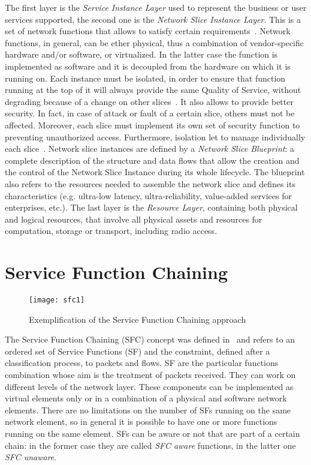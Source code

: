 The first layer is the \emph{Service Instance Layer} used to represent the
business or user services supported, the second one is the \emph{Network Slice
Instance Layer}. This is a set of network functions that allows to
satisfy certain requirements~\cite{kotulski2017end}. Network functions, in
general, can be ether physical, thus a combination of vendor-specific hardware
and/or software, or virtualized. In the latter case the function is implemented
as software and it is decoupled from the hardware on which it is running on.
Each instance must be isolated, in order to ensure that function running at the
top of it will always provide the same Quality of Service, without degrading
because of a change on other slices~\cite{richart2016resource}. It also allows
to provide better security. In fact, in case of attack or fault of a certain
slice, others must not be affected. Moreover, each slice must implement its own
set of security function to preventing unauthorized access. Furthermore,
isolation let to manage individually each slice~\cite{ordonez2017network}.
Network slice instances are defined by a \emph{Network Slice Blueprint}: a
complete description of the structure and data flows that allow the creation and
the control of the Network Slice Instance during its whole lifecycle. The
blueprint also refers to the resources needed to assemble the network slice and
defines its characteristics (e.g. ultra-low latency, ultra-reliability,
value-added services for enterprises, etc.). The last layer is the
\emph{Resource Layer}, containing both physical and logical resources, that
involve all physical assets and resources for computation, storage or transport,
including radio access.

\section{Service Function Chaining}
\begin{figure}
  \centering
  \texttt{[image: sfc1]}
  \caption{Exemplification of the Service Function Chaining approach}
  \label{chap:background:img:sfc}
\end{figure}

The Service Function Chaining (SFC) concept was defined
in~\cite{halpern2015service} and refers to an ordered set of Service Functions
(SF) and the constraint, defined after a classification process, to packets and
flows. SF are the particular functions combination whose aim is the treatment of
packets received. They can work on different levels of the network layer. These
components can be implemented as virtual elements only or in a combination of a
physical and software network elements. There are no limitations on the number
of SFs running on the same network element, so in general it is possible to have
one or more functions running on the same element. SFs can be aware or not that
are part of a certain chain: in the former case they are called \emph{SFC aware}
functions, in the latter one \emph{SFC unaware}.

